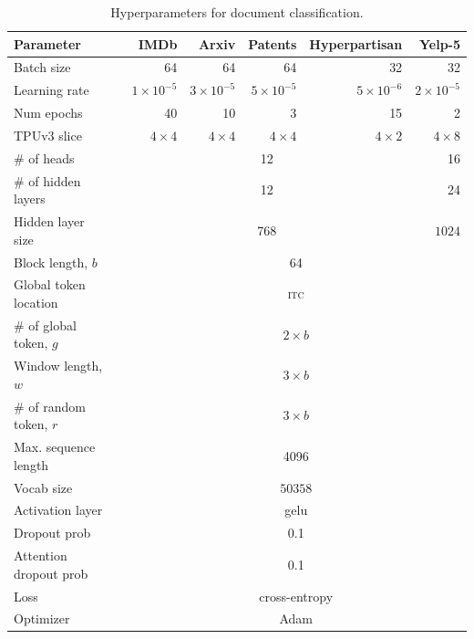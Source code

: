 \begin{table}[bht]
\small
\centering
\begin{tabular}{@{}l c r r r r r @{}}
\toprule
Parameter & & IMDb & Arxiv & Patents & Hyperpartisan & Yelp-5  \\
\midrule
 Batch size & & 64 & 64 & 64 & 32 & 32 \\
 Learning rate & & $1\times 10^{-5}$ & $3\times 10^{-5}$ & $5\times 10^{-5}$ & $5\times 10^{-6}$ & $2\times 10^{-5}$\\
 Num epochs & & 40 & 10 & 3 & 15 & 2 \\
 TPUv3 slice  & & $4 \times 4$ & $4 \times 4$ & $4 \times 4$ & $4 \times 2$ & $4 \times 8$ \\
 $\#$ of heads & & \multicolumn{4}{c}{12} & 16\\
 $\#$ of hidden layers & & \multicolumn{4}{c}{12} & 24 \\
 Hidden layer size & & \multicolumn{4}{c}{768} & $1024$ \\
 Block length, $b$ & & \multicolumn{5}{c}{64} \\
 Global token location & & \multicolumn{5}{c}{\textsc{itc}} \\
 $\#$ of global token, $g$ & & \multicolumn{5}{c}{$2\times b$} \\
 Window length, $w$  & & \multicolumn{5}{c}{$3\times b$ } \\
 $\#$ of random token, $r$ & & \multicolumn{5}{c}{$3\times b$} \\
 Max. sequence length & & \multicolumn{5}{c}{4096}\\
 Vocab size & & \multicolumn{5}{c}{$50358$}\\
 Activation layer & & \multicolumn{5}{c}{gelu} \\ 
 Dropout prob & & \multicolumn{5}{c}{0.1} \\
 Attention dropout prob & & \multicolumn{5}{c}{0.1} \\
 Loss & & \multicolumn{5}{c}{cross-entropy} \\
 Optimizer & & \multicolumn{5}{c}{Adam}\\
\bottomrule
\end{tabular}
\vspace{2mm}
\caption{Hyperparameters for document classification.}
\label{tab:app_dc}
\end{table}

